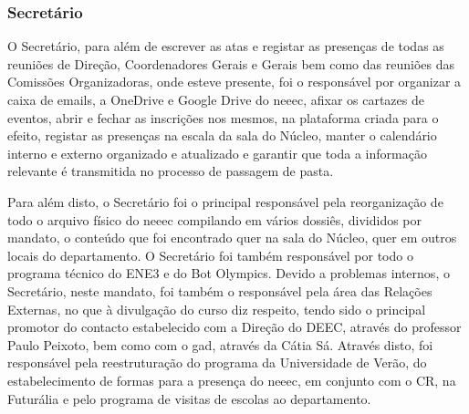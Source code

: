 
\subsubsection{Secretário}

O Secretário, para além de escrever as atas e registar as presenças de todas as reuniões de Direção, Coordenadores Gerais e Gerais bem como das reuniões das Comissões Organizadoras, onde esteve presente, foi o responsável por organizar a caixa de emails, a OneDrive e Google Drive do \acrshort{neeec}, afixar os cartazes de eventos, abrir e fechar as inscrições nos mesmos, na plataforma criada para o efeito, registar as presenças na escala da sala do Núcleo, manter o calendário interno e externo organizado e atualizado e garantir que toda a informação relevante é transmitida no processo de passagem de pasta.

Para além disto, o Secretário foi o principal responsável pela reorganização de todo o arquivo físico do \acrshort{neeec} compilando em vários dossiês, divididos por mandato, o conteúdo que foi encontrado quer na sala do Núcleo, quer em outros locais do departamento. O Secretário foi também responsável por todo o programa técnico do ENE3 e do Bot Olympics. Devido a problemas internos, o Secretário, neste mandato, foi também o responsável pela área das Relações Externas, no que à divulgação do curso diz respeito, tendo sido o principal promotor do contacto estabelecido com a Direção do DEEC, através do professor Paulo Peixoto, bem como com o \acrfull{gad}, através da Cátia Sá. Através disto, foi responsável pela reestruturação do programa da Universidade de Verão, do estabelecimento de formas para a presença do \acrshort{neeec}, em conjunto com o CR, na Futurália e pelo programa de visitas de escolas ao departamento.